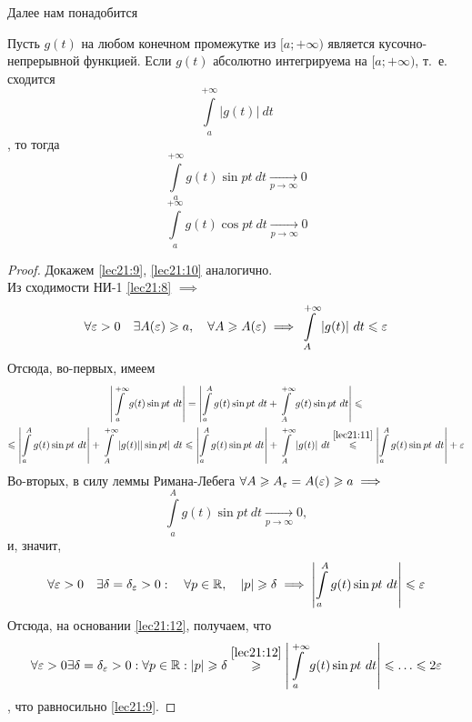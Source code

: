 \documentclass[../../main.tex]{subfiles}
\begin{document}
Далее нам понадобится
\begin{thm}
	Пусть $ g(t) $ на любом конечном промежутке из $ [a; +\infty) $
	является кусочно-непрерывной функцией. Если $ g(t) $ 
	абсолютно интегрируема на $ [a; +\infty) $, т.~е.
	сходится 
	\begin{equation}
	\label{lec21:8}
	\int\limits_{a}^{+\infty} |g(t)|\ dt
	\end{equation}, то тогда
	\begin{equation}
	\label{lec21:9}
	\int\limits_{a}^{+\infty} g(t) \sin pt\ dt
	\underset{p \to \infty}{\to} 0
	\end{equation}
	\begin{equation}
	\label{lec21:10}
	\int\limits_{a}^{+\infty} g(t) \cos pt\ dt
	\underset{p \to \infty}{\to} 0
	\end{equation}
\end{thm}
\begin{proof}
	Докажем \eqref{lec21:9}, \eqref{lec21:10} аналогично.\\
	Из сходимости НИ-1 \eqref{lec21:8} $ \implies $
	\begin{equation}
	\label{lec21:11}
	\forall \varepsilon > 0 \quad \exists A(\varepsilon) \geqslant a, \quad
	\forall A \geqslant A(\varepsilon) \implies 
	\int\limits_{A}^{+\infty} |g(t)|\ dt \leqslant \varepsilon
	\end{equation}
	Отсюда, во-первых, имеем
	\begin{equation}
	\label{lec21:12}
	\begin{gathered}
	\left|  
	\int\limits_{a}^{+\infty} g(t) \sin pt\ dt
	\right| = \left|
	\int\limits_{a}^{A} g(t) \sin pt\ dt +
	\int\limits_{A}^{+\infty} g(t) \sin pt\ dt
	\right| \leqslant \\
	\leqslant \left|
	\int\limits_{a}^{A} g(t) \sin pt\ dt
	\right| +
	\int\limits_{A}^{+\infty} |g(t)||\sin pt|\ dt \leqslant
	\left|
	\int\limits_{a}^{A} g(t) \sin pt\ dt
	\right| +
	\int\limits_{A}^{+\infty} |g(t)|\ dt \stackrel{\eqref{lec21:11}}{\leqslant}
	\left|
	\int\limits_{a}^{A} g(t) \sin pt\ dt
	\right| + \varepsilon
	\end{gathered}
	\end{equation}
	Во-вторых, в силу леммы Римана-Лебега 
	$ \forall A \geqslant A_\varepsilon = A(\varepsilon) \geqslant a \implies $
	\[
	\int\limits_{a}^{A} g(t) \sin pt\ dt \underset{p \to \infty}{\to} 0,
	\]
	и, значит,
	\[
	\forall \varepsilon > 0 \quad \exists \delta = \delta_\varepsilon > 0:\quad
	\forall p \in \mathbb{R},\quad |p| \geqslant \delta \implies
	\left|
	\int\limits_{a}^{A} g(t) \sin pt\ dt
	\right| \leqslant \varepsilon
	\]
	Отсюда, на основании \eqref{lec21:12}, получаем, что
	\[
	\forall \eps > 0 \exists \delta = \delta_\eps > 0: 
	\forall p \in \R: |p| \geq \delta
	\stackrel{\eqref{lec21:12}}{\geq}
	\left|
	\int\limits_{a}^{+\infty} g(t) \sin pt\ dt
	\right| \leq \dots \leq 2\eps
	\], что равносильно \eqref{lec21:9}.
\end{proof}
\end{document}
